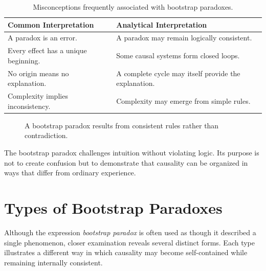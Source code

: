 \documentclass[12pt,oneside,openany]{book}
\begin{document}
\begin{table}[H]
\centering
\begin{tabular}{|p{4.4cm}|p{7.6cm}|}
\hline
\textbf{Common Interpretation} & \textbf{Analytical Interpretation}\\
\hline
A paradox is an error. & A paradox may remain logically consistent.\\
\hline
Every effect has a unique beginning. & Some causal systems form closed loops.\\
\hline
No origin means no explanation. & A complete cycle may itself provide the explanation.\\
\hline
Complexity implies inconsistency. & Complexity may emerge from simple rules.\\
\hline
\end{tabular}
\caption{Misconceptions frequently associated with bootstrap paradoxes.}
\end{table}

\begin{figure}[H]
\centering
{}
\caption{A bootstrap paradox results from consistent rules rather than contradiction.}
\end{figure}

\begin{tcolorbox}[colback=blue!5,colframe=blue!60!black,title=Analysis]
The bootstrap paradox challenges intuition without violating logic. Its
purpose is not to create confusion but to demonstrate that causality can be
organized in ways that differ from ordinary experience.
\end{tcolorbox}
\section{Types of Bootstrap Paradoxes}

Although the expression \textit{bootstrap paradox} is often used as though it
described a single phenomenon, closer examination reveals several distinct
forms. Each type illustrates a different way in which causality may become
self-contained while remaining internally consistent.
\end{document}
